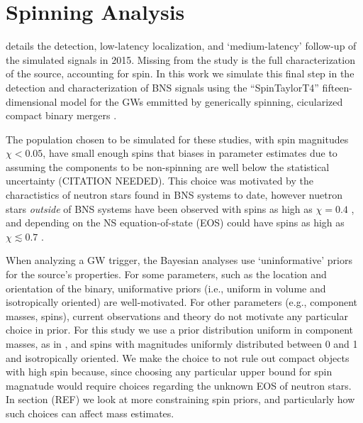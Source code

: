 \section{Spinning Analysis}

\citet{2013arXiv1304.0670L} details the detection, low-latency localization, and `medium-latency' follow-up of the simulated signals in 2015.  Missing from the study is the full characterization of the source, accounting for spin.  In this work we simulate this final step in the detection and characterization of BNS signals using the ``SpinTaylorT4'' fifteen-dimensional model for the GWs emmitted by generically spinning, cicularized compact binary mergers \cite{Buonanno_2003,Buonanno_2009}. 

The population chosen to be simulated for these studies, with spin magnitudes $\chi < 0.05$, have small enough spins that biases in parameter estimates due to assuming the components to be non-spinning are well below the statistical uncertainty (CITATION NEEDED).  This choice was motivated by the charactistics of neutron stars found in BNS systems to date, however nuetron stars \emph{outside} of BNS systems have been observed with spins as high as $\chi = 0.4$ \cite{Hessels_2006,Brown_2012}, and depending on the NS equation-of-state (EOS) could have spins as high as $\chi \lesssim 0.7$ \cite{Lo_2011}.

When analyzing a GW trigger, the Bayesian analyses use `uninformative' priors for the source's properties.  For some parameters, such as the location and orientation of the binary, uniformative priors (i.e., uniform in volume and isotropically oriented) are well-motivated.  For other parameters (e.g., component masses, spins), current observations and theory do not motivate any particular choice in prior.  For this study we use a prior distribution uniform in component masses, as in \citet{2013arXiv1304.0670L}, and spins with magnitudes uniformly distributed between 0 and 1 and isotropically oriented.  We make the choice to not rule out compact objects with high spin because, since choosing any particular upper bound for spin magnatude would require choices regarding the unknown EOS of neutron stars.  In section (REF) we look at more constraining spin priors, and particularly how such choices can affect mass estimates.